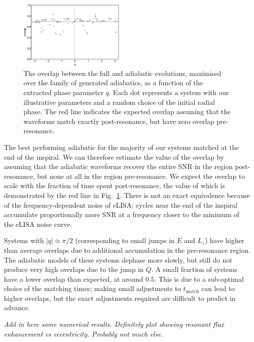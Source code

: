 \documentclass[aps,prd,amsfonts,amssymb,amsmath,nofootinbib,showpacs,superscriptaddress,twocolumn]{revtex4}
\newcommand{\figref}[1]{Fig.~\ref{fig:#1}}
\newcommand{\sub}[1]{\ensuremath{_\mathrm{#1}}}
\begin{document}
\begin{figure}
\centering
\includegraphics[width=0.46\textwidth]{overlap_vs_q}
\caption{\label{fig:overlap-vs-q}The overlap between the full and adiabatic evolutions, maximised over the family of generated adiabatics, as a function of the extracted phase parameter $q$. Each dot represents a system with our illustrative parameters and a random choice of the initial radial phase. The red line indicates the expected overlap assuming that the waveforms match exactly post-resonance, but have zero overlap pre-resonance.}
\end{figure}

The best performing adiabatic for the majority of our systems matched at the end of the inspiral. We can therefore estimate the value of the overlap by assuming that the adiabatic waveforms recover the entire SNR in the region post-resonance, but none at all in the region pre-resonance. We expect the overlap to scale with the fraction of time spent post-resonance, the value of which is demonstrated by the red line in \figref{overlap-vs-q}. There is not an exact equivalence because of the frequency-dependent noise of eLISA; cycles near the end of the inspiral accumulate proportionally more SNR at a frequency closer to the minimum of the eLISA noise curve.

Systems with $|q| \approx \pi/2$ (corresponding to small jumps in $E$ and $L_z$) have higher than average overlaps due to additional accumulation in the pre-resonance region. The adiabatic models of these systems dephase more slowly, but still do not produce very high overlaps due to the jump in $Q$. A small fraction of systems have a lower overlap than expected, at around $0.5$. This is due to a sub-optimal choice of the matching times; making small adjustments to $t\sub{match}$ can lead to higher overlaps, but the exact adjustments required are difficult to predict in advance.

\emph{Add in here some numerical results. Definitely plot showing resonant flux enhancement vs eccentricity. Probably not much else.}
\end{document}
